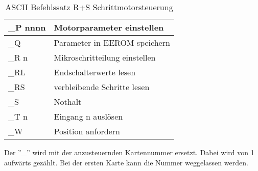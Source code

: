 \begin{table}[htb]
\begin{tabular}{|l|l|}
\rule[-1ex]{0pt}{2.5ex} \_P nnnn 	& Motorparameter einstellen                    \\ \hline 
\rule[-1ex]{0pt}{2.5ex} \_Q 		& Parameter in EEROM speichern                 \\ \hline 
\rule[-1ex]{0pt}{2.5ex} \_R n 		& Mikroschritteilung einstellen                \\ \hline 
\rule[-1ex]{0pt}{2.5ex} \_RL 		& Endschalterwerte lesen                       \\ \hline 
\rule[-1ex]{0pt}{2.5ex} \_RS  		& verbleibende Schritte lesen                  \\ \hline 
\rule[-1ex]{0pt}{2.5ex} \_S   		& Nothalt                                      \\ \hline 
\rule[-1ex]{0pt}{2.5ex} \_T n 		& Eingang n auslösen                           \\ \hline 
\rule[-1ex]{0pt}{2.5ex} \_W   		& Position anfordern                           \\ \hline 
\end{tabular} 
\caption{ASCII Befehlssatz R+S Schrittmotorsteuerung}\cite{rs:ug_stepper}
Der ''\_''  wird mit der anzusteuernden Kartennummer ersetzt. Dabei wird von 1 aufwärts gezählt. Bei der ersten Karte kann die Nummer weggelassen werden.
\label{tbl:ASCII_RS}
\end{table}


